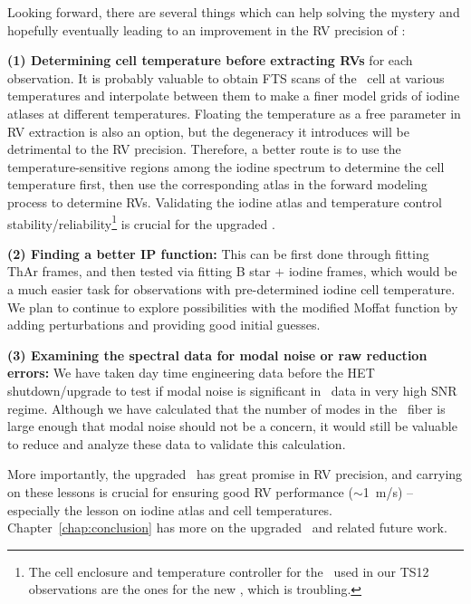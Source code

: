 Looking forward, there are several things which can help solving the
mystery and hopefully eventually leading to an improvement in the RV
precision of \het:

{\bf (1) Determining cell temperature before extracting RVs} for each
observation. It is probably valuable to obtain FTS scans of the \het\
cell at various temperatures and interpolate between them to make a
finer model grids of iodine atlases at different
temperatures. Floating the temperature as a free parameter in RV
extraction is also an option, but the degeneracy it introduces will be
detrimental to the RV precision. Therefore, a better route is to use
the temperature-sensitive regions among the iodine spectrum to
determine the cell temperature first, then use the corresponding atlas
in the forward modeling process to determine RVs. Validating the
iodine atlas and temperature control
stability/reliability\footnote{The cell enclosure and temperature
controller for the \het\ used in our TS12 observations are the ones
for the new \het, which is troubling.} is crucial for the upgraded
\het.

{\bf (2) Finding a better IP function:} This can be first done through
fitting ThAr frames, and then tested via fitting B star $+$ iodine
frames, which would be a much easier task for observations with
pre-determined iodine cell temperature. We plan to continue to explore
possibilities with the modified Moffat function by adding
perturbations and providing good initial guesses.

{\bf (3) Examining the spectral data for modal noise or raw reduction
errors:} We have taken day time engineering data before the HET
shutdown/upgrade to test if modal noise is significant in \het\ data
in very high SNR regime. Although we have calculated that the number
of modes in the \het\ fiber is large enough that modal noise should
not be a concern, it would still be valuable to reduce and analyze
these data to validate this calculation.

More importantly, the upgraded \het\ has great promise in RV
precision, and carrying on these lessons is crucial for ensuring good
RV performance ($\sim$1~m/s) -- especially the lesson on iodine atlas
and cell temperatures. Chapter~\ref{chap:conclusion} has more
on the upgraded \het\ and related future work.



